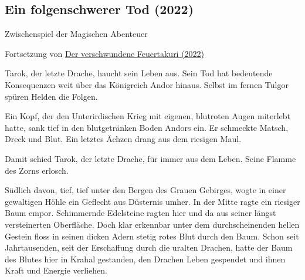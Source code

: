 \begin{chapterbox}
    \chapter{Ein folgenschwerer Tod (2022)}
    \label{2022-ein-folgenschwerer-tod}

    \begin{center}
        Zwischenspiel der Magischen Abenteuer

        Fortsetzung von \hyperref[2022-der-verschwundene-feuertakuri]{Der verschwundene Feuertakuri (2022)}
    \end{center}
    
    Tarok, der letzte Drache, haucht sein Leben aus. Sein Tod hat bedeutende Konsequenzen weit über das Königreich Andor hinaus. Selbst im fernen Tulgor spüren Helden die Folgen. 

\end{chapterbox}




\newpage
{}


Ein Kopf, der den Unterirdischen Krieg mit eigenen, blutroten Augen miterlebt hatte, sank tief in den blutgetränken Boden Andors ein. Er schmeckte Matsch, Dreck und Blut. Ein letztes Ächzen drang aus dem riesigen Maul.

Damit schied Tarok, der letzte Drache, für immer aus dem Leben. Seine Flamme des Zorns erlosch.

Südlich davon, tief, tief unter den Bergen des Grauen Gebirges, wogte in einer gewaltigen Höhle ein Geflecht aus Düsternis umher. In der Mitte ragte ein riesiger Baum empor. Schimmernde Edelsteine ragten hier und da aus seiner längst versteinerten Oberfläche. Doch klar erkennbar unter dem durchscheinenden hellen Gestein floss in seinen dicken Adern stetig rotes Blut durch den Baum. Schon seit Jahrtausenden, seit der Erschaffung durch die uralten Drachen, hatte der Baum des Blutes hier in Krahal gestanden, den Drachen Leben gespendet und ihnen Kraft und Energie verliehen.


